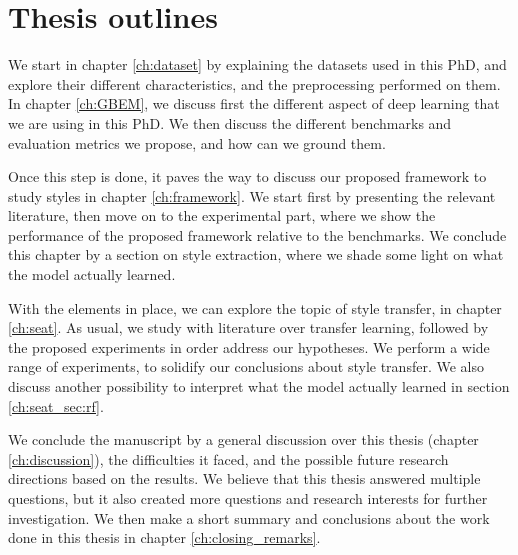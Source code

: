 %
%

\section{Thesis outlines}
\par We start in chapter \ref{ch:dataset} by explaining the datasets used in this PhD, and explore their different characteristics, and the preprocessing performed on them. In chapter \ref{ch:GBEM}, we discuss first the different aspect of deep learning that we are using in this PhD. We then discuss the different benchmarks and evaluation metrics we propose, and how can we ground them.

\par Once this step is done, it paves the way to discuss our proposed framework to study styles in chapter \ref{ch:framework}. We start first by presenting the relevant literature, then move on to the experimental part, where we show the performance of the proposed framework relative to the benchmarks. We conclude this chapter by a section on style extraction, where we shade some light on what the model actually learned.

\par With the elements in place, we can explore the topic of style transfer, in chapter \ref{ch:seat}. As usual, we study with literature over transfer learning, followed by the proposed experiments in order address our hypotheses. We perform a wide range of experiments, to solidify our conclusions about style transfer. We also discuss another possibility to interpret what the model actually learned in section \ref{ch:seat_sec:rf}.

\par We conclude the manuscript by a general discussion over this thesis (chapter \ref{ch:discussion}), the difficulties it faced, and the possible future research directions based on the results. We believe that this thesis answered multiple questions, but it also created more questions and research interests for further investigation. We then make a short summary and conclusions about the work done in this thesis in chapter \ref{ch:closing_remarks}.
